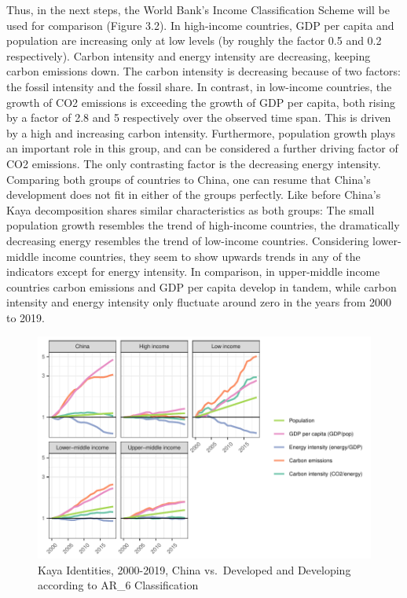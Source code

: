 \documentclass[
  12pt,
]{article}
\numberwithin{equation}{section}
\numberwithin{table}{section}
\numberwithin{figure}{section}
\begin{document}
Thus, in the next steps, the World Bank's Income Classification Scheme
will be used for comparison (Figure 3.2). In high-income countries, GDP
per capita and population are increasing only at low levels (by roughly
the factor 0.5 and 0.2 respectively). Carbon intensity and energy
intensity are decreasing, keeping carbon emissions down. The carbon
intensity is decreasing because of two factors: the fossil intensity and
the fossil share. In contrast, in low-income countries, the growth of
CO2 emissions is exceeding the growth of GDP per capita, both rising by
a factor of 2.8 and 5 respectively over the observed time span. This is
driven by a high and increasing carbon intensity. Furthermore,
population growth plays an important role in this group, and can be
considered a further driving factor of CO2 emissions. The only
contrasting factor is the decreasing energy intensity. Comparing both
groups of countries to China, one can resume that China's development
does not fit in either of the groups perfectly. Like before China's Kaya
decomposition shares similar characteristics as both groups: The small
population growth resembles the trend of high-income countries, the
dramatically decreasing energy resembles the trend of low-income
countries. Considering lower-middle income countries, they seem to show
upwards trends in any of the indicators except for energy intensity. In
comparison, in upper-middle income countries carbon emissions and GDP
per capita develop in tandem, while carbon intensity and energy
intensity only fluctuate around zero in the years from 2000 to 2019.

\begin{figure}
\centering
\includegraphics{Paper_files/figure-latex/unnamed-chunk-5-1.pdf}
\caption{Kaya Identities, 2000-2019, China vs.~Developed and Developing
according to AR\_6 Classification}
\end{figure}
\end{document}
